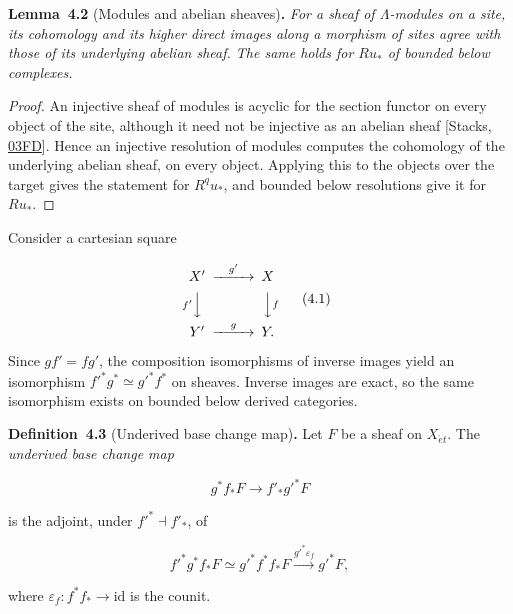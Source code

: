 \documentclass[11pt]{article}
\newenvironment{bpstatement}[2]{\par\addvspace{0.6\baselineskip}\noindent\textbf{#1}#2\textbf{.}\enspace\ignorespaces}
  {\par\addvspace{0.4\baselineskip}}
\newenvironment{bpstatementit}[2]{\begin{bpstatement}{#1}{#2}\itshape\ignorespaces}{\end{bpstatement}}
\begin{document}
\label{bp8}%
\begin{bpstatementit}{Lemma~4.2}{ (Modules and abelian sheaves)}
For a sheaf of \(\Lambda\)-modules on a site, its cohomology and its higher direct images along a morphism of sites agree with those of its underlying abelian sheaf. The same holds for \(Ru_*\) of bounded below complexes.
\end{bpstatementit}

\begin{proof}[{Proof}]\label{bp9}%
An injective sheaf of modules is acyclic for the section functor on every object of the site, although it need not be injective as an abelian sheaf [Stacks, \href{https://stacks.math.columbia.edu/tag/03FD}{03FD}]. Hence an injective resolution of modules computes the cohomology of the underlying abelian sheaf, on every object. Applying this to the objects over the target gives the statement for \(R^qu_*\), and bounded below resolutions give it for \(Ru_*\).
\end{proof}

\label{bp10}%
Consider a cartesian square

\[
\begin{CD}
X' @>{g'}>> X\\
@V{f'}VV @VV{f}V\\
Y' @>{g}>> Y.
\end{CD}
\tag{4.1}
\]

Since \(gf'=fg'\), the composition isomorphisms of inverse images yield an isomorphism \(f'^*g^*\simeq g'^*f^*\) on sheaves. Inverse images are exact, so the same isomorphism exists on bounded below derived categories.

\label{bp11}%
\begin{bpstatement}{Definition~4.3}{ (Underived base change map)}
Let \(F\) be a sheaf on \(X_{\acute{e}t}\). The \emph{underived base change map}

\[
g^*f_*F\longrightarrow f'_*g'^*F
\tag{4.2}
\]

is the adjoint, under \(f'^*\dashv f'_*\), of

\[
f'^*g^*f_*F
\simeq g'^*f^*f_*F
\xrightarrow{g'^*\varepsilon_f}g'^*F,
\]

where \(\varepsilon_f:f^*f_*\to\mathrm{id}\) is the counit.
\end{bpstatement}
\end{document}
